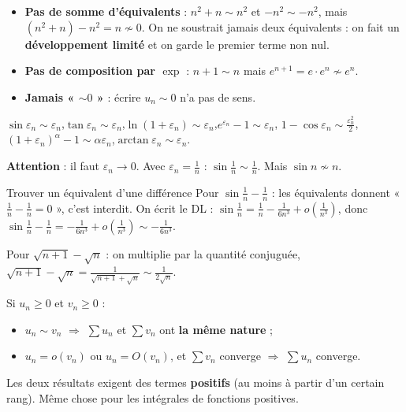 \documentclass[a4paper,10pt]{article}
\begin{document}
\begin{PIEGE}
\begin{itemize}
\item \textbf{Pas de somme d'équivalents} : $n^2+n\sim n^2$ et $-n^2\sim-n^2$, mais $(n^2+n)-n^2=n\not\sim0$. On ne soustrait
jamais deux équivalents : on fait un \textbf{développement limité} et on garde le premier terme non nul.
\item \textbf{Pas de composition par $\exp$} : $n+1\sim n$ mais $e^{n+1}=e\cdot e^n\not\sim e^n$.
\item \textbf{Jamais « $\sim0$ »} : écrire $u_n\sim0$ n'a pas de sens.
\end{itemize}
\end{PIEGE}

\begin{FORM}
$\sin\varepsilon_n\sim\varepsilon_n$,\quad $\tan\varepsilon_n\sim\varepsilon_n$,\quad $\ln(1+\varepsilon_n)\sim\varepsilon_n$,\quad $e^{\varepsilon_n}-1\sim\varepsilon_n$,\quad
$1-\cos\varepsilon_n\sim\frac{\varepsilon_n^2}2$,\quad $(1+\varepsilon_n)^\alpha-1\sim\alpha\varepsilon_n$,\quad $\arctan\varepsilon_n\sim\varepsilon_n$.

\textbf{Attention} : il faut $\varepsilon_n\to0$. Avec $\varepsilon_n=\frac1n$ : $\sin\frac1n\sim\frac1n$. Mais $\sin n\not\sim n$.
\end{FORM}

\begin{METH}{Trouver un équivalent d'une différence}
Pour $\sin\frac1n-\frac1n$ : les équivalents donnent « $\frac1n-\frac1n=0$ », c'est interdit. On écrit le DL :
$\sin\frac1n=\frac1n-\frac1{6n^3}+o\left(\frac1{n^3}\right)$, donc $\sin\frac1n-\frac1n=-\frac1{6n^3}+o\left(\frac1{n^3}\right)\sim-\frac1{6n^3}$.

Pour $\sqrt{n+1}-\sqrt n$ : on multiplie par la quantité conjuguée, $\sqrt{n+1}-\sqrt n=\frac1{\sqrt{n+1}+\sqrt n}\sim\frac1{2\sqrt n}$.
\end{METH}

\begin{PROP}
Si $u_n\geq0$ et $v_n\geq0$ :
\begin{itemize}
\item $u_n\sim v_n$ $\Rightarrow$ $\sum u_n$ et $\sum v_n$ ont \textbf{la même nature} ;
\item $u_n=o(v_n)$ ou $u_n=O(v_n)$, et $\sum v_n$ converge $\Rightarrow$ $\sum u_n$ converge.
\end{itemize}
Les deux résultats exigent des termes \textbf{positifs} (au moins à partir d'un certain rang). Même chose pour les intégrales de fonctions positives.
\end{PROP}
\end{document}

